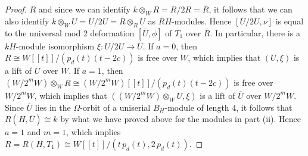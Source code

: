 \documentclass{amsart}
\theoremstyle{plain}
\theoremstyle{definition}
\theoremstyle{remark}
\begin{document}
\begin{proof}
$R$ and since we can identify $k\otimes_WR=R/2R=\overline{R}$, it follows that we 
can also identify $k\otimes_W U = U/2U = \overline{R}\otimes_R U$ as $\overline{R}H$-modules. 
Hence $[U/2U,\nu]$ is
equal to the universal mod $2$ deformation $[\overline{U},\phi]$ of $T_1$ over $\overline{R}$.
In particular, there is a $kH$-module isomorphism $\xi:U/2U\to \overline{U}$.
If $a=0$, then $R\cong W[[t]]/(p_d(t)(t-2c))$ is free over $W$, which implies that
$(U,\xi)$ is a lift of $\overline{U}$ over $W$.
If $a=1$, then $(W/2^mW)\otimes_W R\cong (W/2^m W)[[t]]/(p_d(t) (t-2c))$ is free over 
$W/2^mW$, which implies that $((W/2^mW)\otimes_W U, \xi)$ is a lift of $\overline{U}$ over 
$W/2^mW$. Since $\overline{U}$ lies in the $\Omega$-orbit of a uniserial $B_H$-module of
length $4$, it follows that $R(H,\overline{U})\cong k$ by what we have proved above for the modules
in part (ii). Hence $a=1$ and $m=1$, which implies $R=R(H,T_1)\cong W[[t]]/(t\,p_d(t),2\,p_d(t))$.
\end{proof}
\end{document}
